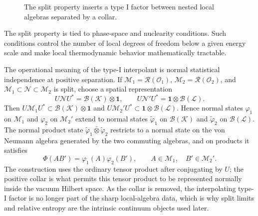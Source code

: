 \begin{figure}[H]
  \centering
  \caption{The split property inserts a type I factor between nested local
  algebras separated by a collar.}
  \label{fig:split-property}
\end{figure}

The split property is tied to phase-space and nuclearity conditions.  Such
conditions control the number of local degrees of freedom below a given energy
scale and make local thermodynamic behavior mathematically tractable.

The operational meaning of the type-I interpolant is normal statistical
independence at positive separation.  If
\(\mathcal M_1=\mathcal R(\mathcal O_1)\),
\(\mathcal M_2=\mathcal R(\mathcal O_2)\), and
\(\mathcal M_1\subset\mathcal N\subset\mathcal M_2\) is split, choose a
spatial representation
\[
  U\mathcal N U^*=\mathcal B(\mathcal K)\otimes\mathbf 1,
  \qquad
  U\mathcal N'U^*=\mathbf 1\otimes\mathcal B(\mathcal L).
\]
Then \(U\mathcal M_1U^*\subset\mathcal B(\mathcal K)\otimes\mathbf 1\) and
\(U\mathcal M_2'U^*\subset\mathbf 1\otimes\mathcal B(\mathcal L)\).  Hence
normal states \(\varphi_1\) on \(\mathcal M_1\) and \(\varphi_2\) on
\(\mathcal M_2'\) extend to normal states
\(\widetilde\varphi_1\) on \(\mathcal B(\mathcal K)\) and
\(\widetilde\varphi_2\) on \(\mathcal B(\mathcal L)\).  The normal product
state
\(\widetilde\varphi_1\bar\otimes\widetilde\varphi_2\) restricts to a normal
state on the von Neumann algebra generated by the two commuting algebras, and
on products it satisfies
\[
  \Phi(AB')
  =
  \varphi_1(A)\varphi_2(B'),
  \qquad
  A\in\mathcal M_1,\quad B'\in\mathcal M_2' .
\]
The construction uses the ordinary tensor product after conjugating by \(U\);
the positive collar is what permits this tensor product to be represented
normally inside the vacuum Hilbert space.  As the collar is removed, the
interpolating type-I factor is no longer part of the sharp local-algebra data,
which is why split limits and relative entropy are the intrinsic continuum
objects used later.

